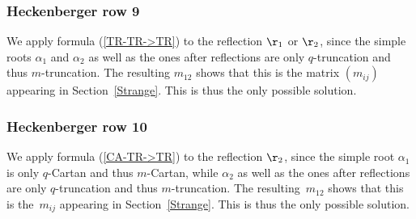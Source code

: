 \documentclass[pdftex]{sigma}%
\numberwithin{equation}{section}
\begin{document}
\subsubsection*{Heckenberger row 9}
We apply formula (\ref{TR-TR->TR}) to the reflection $\r_1$ or $\r_2$, since the simple roots $\alpha_1$ and $\alpha_2$ as well as the ones after reflections are only $q$-truncation and thus $m$-truncation. The resulting $m_{12}$ shows that this is the matrix $(m_{ij})$ appearing in Section~\ref{Strange}. This is thus the only possible solution.

\subsubsection*{Heckenberger row 10}
We apply formula (\ref{CA-TR->TR}) to the reflection $\r_{2}$, since the simple root $\alpha_1$ is only $q$-Cartan and thus $m$-Cartan, while $\alpha_2$ as well as the ones after reflections are only $q$-truncation and thus $m$-truncation. The resulting~$m_{12}$ shows that this is the~$m_{ij}$ appearing in Section~\ref{Strange}. This is thus the only possible solution.
\end{document}
